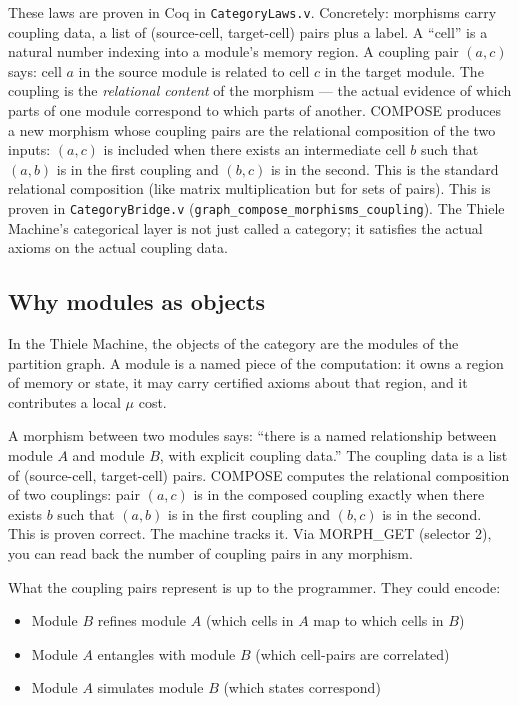 \documentclass[11pt,a4paper]{article}
\theoremstyle{plain}
\theoremstyle{definition}
\theoremstyle{remark}
\begin{document}
These laws are proven in Coq in \texttt{CategoryLaws.v}. Concretely: morphisms carry coupling data, a list of (source-cell, target-cell) pairs plus a label. A ``cell'' is a natural number indexing into a module's memory region. A coupling pair $(a, c)$ says: cell $a$ in the source module is related to cell $c$ in the target module. The coupling is the \emph{relational content} of the morphism --- the actual evidence of which parts of one module correspond to which parts of another. COMPOSE produces a new morphism whose coupling pairs are the relational composition of the two inputs: $(a, c)$ is included when there exists an intermediate cell $b$ such that $(a, b)$ is in the first coupling and $(b, c)$ is in the second. This is the standard relational composition (like matrix multiplication but for sets of pairs). This is proven in \texttt{CategoryBridge.v} (\texttt{graph\_compose\_morphisms\_coupling}). The Thiele Machine's categorical layer is not just called a category; it satisfies the actual axioms on the actual coupling data.

\subsection{Why modules as objects}

In the Thiele Machine, the objects of the category are the modules of the partition graph. A module is a named piece of the computation: it owns a region of memory or state, it may carry certified axioms about that region, and it contributes a local $\mu$ cost.

A morphism between two modules says: ``there is a named relationship between module $A$ and module $B$, with explicit coupling data.'' The coupling data is a list of (source-cell, target-cell) pairs. COMPOSE computes the relational composition of two couplings: pair $(a, c)$ is in the composed coupling exactly when there exists $b$ such that $(a, b)$ is in the first coupling and $(b, c)$ is in the second. This is proven correct. The machine tracks it. Via MORPH\_GET (selector 2), you can read back the number of coupling pairs in any morphism.

What the coupling pairs represent is up to the programmer. They could encode:
\begin{itemize}
\item Module $B$ refines module $A$ (which cells in $A$ map to which cells in $B$)
\item Module $A$ entangles with module $B$ (which cell-pairs are correlated)
\item Module $A$ simulates module $B$ (which states correspond)
\end{itemize}
\end{document}

